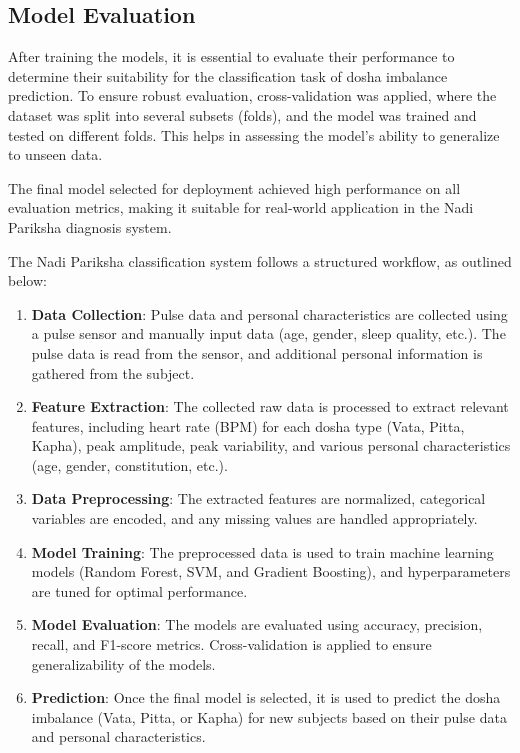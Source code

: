 \documentclass[10pt,twocolumn]{article}
\begin{document}
\subsection{Model Evaluation}

After training the models, it is essential to evaluate their performance to determine their suitability for the classification task of dosha imbalance prediction.
To ensure robust evaluation, cross-validation was applied, where the dataset was split into several subsets (folds), and the model was trained and tested on different folds. This helps in assessing the model’s ability to generalize to unseen data.

The final model selected for deployment achieved high performance on all evaluation metrics, making it suitable for real-world application in the Nadi Pariksha diagnosis system.

The Nadi Pariksha classification system follows a structured workflow, as outlined below:

\begin{enumerate}
    \item \textbf{Data Collection}: Pulse data and personal characteristics are collected using a pulse sensor and manually input data (age, gender, sleep quality, etc.). The pulse data is read from the sensor, and additional personal information is gathered from the subject.
    
    \item \textbf{Feature Extraction}: The collected raw data is processed to extract relevant features, including heart rate (BPM) for each dosha type (Vata, Pitta, Kapha), peak amplitude, peak variability, and various personal characteristics (age, gender, constitution, etc.).
    
    \item \textbf{Data Preprocessing}: The extracted features are normalized, categorical variables are encoded, and any missing values are handled appropriately.
    
    \item \textbf{Model Training}: The preprocessed data is used to train machine learning models (Random Forest, SVM, and Gradient Boosting), and hyperparameters are tuned for optimal performance.
    
    \item \textbf{Model Evaluation}: The models are evaluated using accuracy, precision, recall, and F1-score metrics. Cross-validation is applied to ensure generalizability of the models.
    
    \item \textbf{Prediction}: Once the final model is selected, it is used to predict the dosha imbalance (Vata, Pitta, or Kapha) for new subjects based on their pulse data and personal characteristics.
\end{enumerate}
\end{document}

